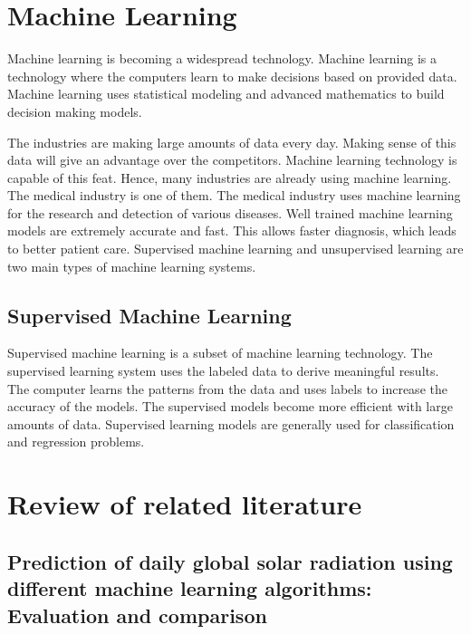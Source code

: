 \section{Machine Learning}\label{sec:machine_learning}

Machine learning is becoming a widespread technology. Machine learning is a technology where the computers learn to make decisions based on provided data. Machine learning uses statistical modeling and advanced mathematics to build decision making models.

The industries are making large amounts of data every day. Making sense of this data will give an advantage over the competitors. Machine learning technology is capable of this feat. Hence, many industries are already using machine learning. The medical industry is one of them. The medical industry uses machine learning for the research and detection of various diseases. Well trained machine learning models are extremely accurate and fast. This allows faster diagnosis, which leads to better patient care. Supervised machine learning and unsupervised learning are two main types of machine learning systems.

\subsection{Supervised Machine Learning}\label{subsec:supervised_machine_learning}

Supervised machine learning is a subset of machine learning technology. The supervised learning system uses the labeled data to derive meaningful results. The computer learns the patterns from the data and uses labels to increase the accuracy of the models. The supervised models become more efficient with large amounts of data. Supervised learning models are generally used for classification and regression problems.

\section{Review of related literature}\label{sec:review_of_related_literature}

\subsection{Prediction of daily global solar radiation using different machine learning algorithms: Evaluation and comparison}
\subsubsection{\citeauthor*{ref_paper_7} \citeyearpar{ref_paper_7}}

